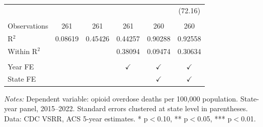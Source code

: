 \begin{table}[htbp]
\begin{tabular}{lccccc}
                        &             &                &               &               & (72.16)\\   
       \\
      Observations      & 261         & 261            & 261           & 260           & 260\\  
      R$^2$             & 0.08619     & 0.45426        & 0.44257       & 0.90288       & 0.92558\\  
      Within R$^2$      &             &                & 0.38094       & 0.09474       & 0.30634\\  
       \\
      Year FE           &             &                & $\checkmark$  & $\checkmark$  & $\checkmark$\\   
      State FE          &             &                &               & $\checkmark$  & $\checkmark$\\   
      \bottomrule
   \end{tabular}
   
   \par \raggedright 
   \textit{Notes:} Dependent variable: opioid overdose deaths per 100,000 population. State-year panel, 2015--2022. Standard errors clustered at state level in parentheses. Data: CDC VSRR, ACS 5-year estimates. * p$<$0.10, ** p$<$0.05, *** p$<$0.01.
\end{table}


